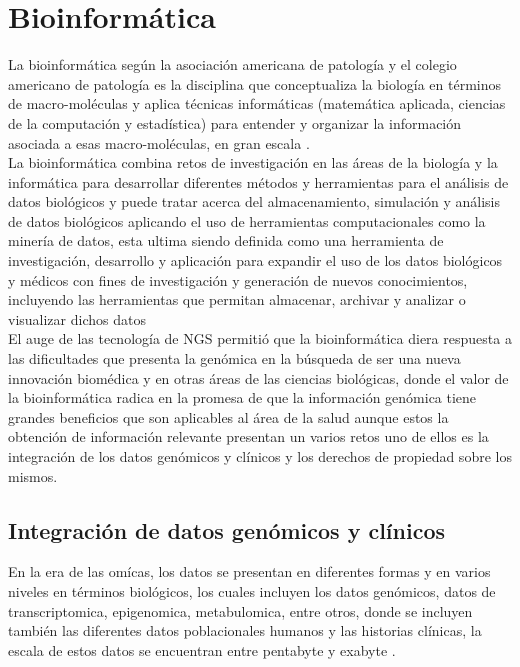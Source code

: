 \section{Bioinformática}


La bioinformática según la asociación americana de patología y el colegio americano de patología es la disciplina que conceptualiza la biología en términos de macro-moléculas y aplica técnicas informáticas (matemática aplicada, ciencias de la computación y estadística) para entender y organizar la información asociada a esas macro-moléculas, en gran escala \cite{Roy2018}.\\  
 
La bioinformática combina retos de investigación en las áreas de la biología y la informática para desarrollar diferentes métodos y herramientas para el análisis de datos biológicos y puede tratar acerca  del almacenamiento, simulación y análisis de datos biológicos aplicando el uso de herramientas computacionales  como la minería de datos, esta ultima siendo definida como una herramienta de investigación, desarrollo y aplicación para expandir el uso de los datos biológicos y médicos con fines de investigación y generación de nuevos conocimientos, incluyendo las herramientas que permitan almacenar, archivar y analizar o visualizar dichos datos \cite{Littlefield} \\

El auge de las tecnología de NGS permitió que la bioinformática diera respuesta a las dificultades que presenta la genómica en la búsqueda de ser una nueva innovación biomédica y en otras áreas de las ciencias biológicas, donde el valor de la bioinformática radica en la promesa de que la información genómica tiene grandes beneficios que son aplicables al área de la salud aunque estos la obtención de información relevante presentan un varios retos uno de ellos es la integración de los datos genómicos y clínicos y los derechos de propiedad sobre los mismos\cite{Searls2010}. 

\subsection{Integración de datos genómicos y clínicos}

En la era de las omícas, los datos se presentan en diferentes formas y en varios niveles en términos biológicos, los cuales incluyen los datos genómicos, datos de transcriptomica, epigenomica, metabulomica, entre otros, donde se incluyen también las diferentes datos poblacionales humanos y las historias clínicas, la escala de estos datos se encuentran  entre  pentabyte y exabyte \cite{Li2014}.\\

